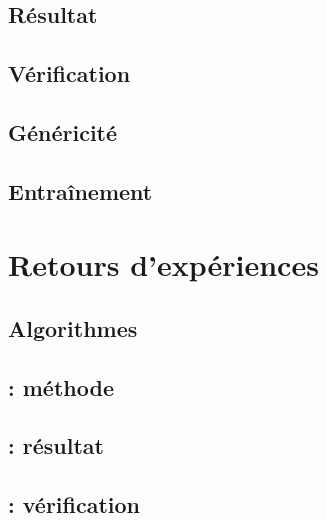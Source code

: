 \subsection{Résultat}\label{instructions:informatique:resultat}

\subsection{Vérification}\label{instructions:informatique:verification}

\subsection{Généricité}\label{instructions:informatique:genericite}

\subsection{Entraînement}\label{instructions:informatique:entrainement}


\section{Retours d'expériences}\label{instructions:retours}

\subsection{Algorithmes}\label{instructions:retours:algorithmes}

\subsection{\mrv : méthode}\label{instructions:retours:methode}

\subsection{\mrv : résultat}\label{instructions:retours:resultat}

\subsection{\mrv : vérification}\label{instructions:retours:verification}
